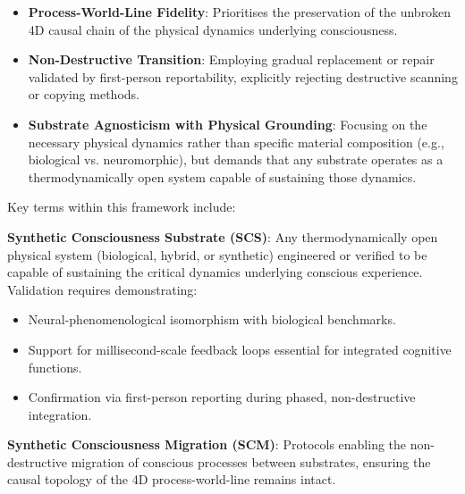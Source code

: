 \documentclass[10pt]{article}
\begin{document}
\begin{sloppypar}
  \begin{itemize}
    \item \textbf{Process-World-Line Fidelity}: Prioritises the preservation of the unbroken 4D causal chain of the physical dynamics underlying consciousness.
    \item \textbf{Non-Destructive Transition}: Employing gradual replacement or repair validated by first-person reportability, explicitly rejecting destructive scanning or copying methods.
    \item \textbf{Substrate Agnosticism with Physical Grounding}: Focusing on the necessary physical dynamics rather than specific material composition (e.g., biological vs. neuromorphic), but demands that any substrate operates as a thermodynamically open system capable of sustaining those dynamics.
  \end{itemize}

  Key terms within this framework include:

  \textbf{Synthetic Consciousness Substrate (SCS)}: Any thermodynamically open physical system (biological, hybrid, or synthetic) engineered or verified to be capable of sustaining the critical dynamics underlying conscious experience. Validation requires demonstrating:
  \begin{itemize}
    \item Neural-phenomenological isomorphism with biological benchmarks.
    \item Support for millisecond-scale feedback loops essential for integrated cognitive functions.
    \item Confirmation via first-person reporting during phased, non-destructive integration.
  \end{itemize}

  \textbf{Synthetic Consciousness Migration (SCM)}: Protocols enabling the non-destructive migration of conscious processes between substrates, ensuring the causal topology of the 4D process-world-line remains intact.


\end{sloppypar}
\end{document}
